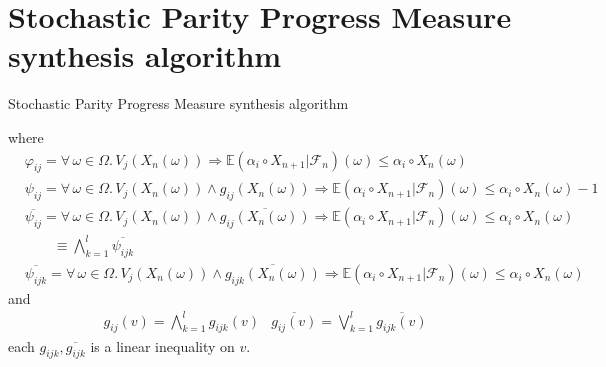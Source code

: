 \documentclass[12pt]{article}
\begin{document}
\section{Stochastic Parity Progress Measure synthesis algorithm}
\begin{algorithm}


	\caption{Stochastic Parity Progress Measure synthesis algorithm}
\end{algorithm}

where
\begin{align*}
	 & \varphi_{ij} = \forall\, \omega \in \Omega.\,
	V_j(X_n(\omega)) \Rightarrow
	\mathbb{E}(\alpha_i\circ X_{n+1}|\mathcal{F}_n)(\omega) \le \alpha_i\circ X_n(\omega)                                        \\
	 & \psi_{ij} = \forall\, \omega \in \Omega.\,
	V_j(X_n(\omega)) \wedge g_{ij}(X_n(\omega)) \Rightarrow
	\mathbb{E}(\alpha_i\circ X_{n+1}|\mathcal{F}_n)(\omega) \le \alpha_i\circ X_n(\omega) - 1                                    \\
	 & \overline{\psi_{ij}} =
	\forall\, \omega \in \Omega.\, V_j(X_n(\omega)) \wedge \overline{g_{ij}(X_n(\omega))} \Rightarrow
	\mathbb{E}(\alpha_i\circ X_{n+1}|\mathcal{F}_n)(\omega) \le \alpha_i\circ X_n(\omega)                                        \\
	 & \qquad \equiv \bigwedge_{k=1}^l \overline{\psi_{ijk}}                                                                     \\
	 & \overline{\psi_{ijk}} = \forall\, \omega \in \Omega.\,V_j(X_n(\omega)) \wedge \overline{g_{ijk}(X_n(\omega))} \Rightarrow
	\mathbb{E}(\alpha_i\circ X_{n+1}|\mathcal{F}_n)(\omega) \le \alpha_i\circ X_n(\omega)
\end{align*}
and
\begin{align*}
	 & g_{ij}(v) = \bigwedge_{k=1}^l g_{ijk}(v) & \overline{g_{ij}(v)} = \bigvee_{k=1}^l \overline{g_{ijk}(v)}
\end{align*}
each $g_{ijk}, \overline{g_{ijk}}$ is a linear inequality on $v$.
\end{document}
